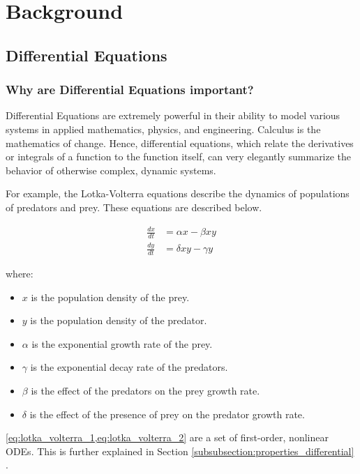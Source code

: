 \section{Background}
\label{section:background}
\subsection{Differential Equations}
\subsubsection{Why are Differential Equations important?}
Differential Equations are extremely powerful in their ability to model various systems in applied mathematics, physics, and engineering. Calculus is the mathematics of change. Hence, differential equations, which relate the derivatives or integrals of a function to the function itself, can very elegantly summarize the behavior of otherwise complex, dynamic systems.

For example, the Lotka-Volterra equations describe the dynamics of populations of predators and prey. These equations are described below.

\begin{align}
    \frac{dx}{dt} &= \alpha x - \beta x y \label{eq:lotka_volterra_1} \\
    \frac{dy}{dt} &= \delta x y - \gamma y \label{eq:lotka_volterra_2}
\end{align}

\noindent
where:
\begin{itemize}
    \item $x$ is the population density of the prey.
    \item $y$ is the population density of the predator.
    \item $\alpha$ is the exponential growth rate of the prey.
    \item $\gamma$ is the exponential decay rate of the predators.
    \item $\beta$ is the effect of the predators on the prey growth rate.
    \item $\delta$ is the effect of the presence of prey on the predator growth rate.
\end{itemize}

\cref{eq:lotka_volterra_1,eq:lotka_volterra_2} are a set of first-order, nonlinear ODEs. This is further explained in Section \ref{subsubsection:properties_differential} .

